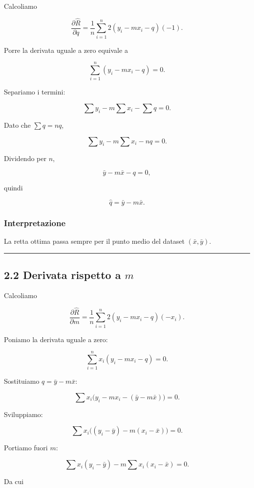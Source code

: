 \documentclass[
]{article}
\begin{document}
Calcoliamo

\[
\frac{\partial \hat R}{\partial q}
=
\frac{1}{n}\sum_{i=1}^n 2(y_i-mx_i-q)(-1).
\]

Porre la derivata uguale a zero equivale a

\[
\sum_{i=1}^n (y_i-mx_i-q)=0.
\]

Separiamo i termini:

\[
\sum y_i - m\sum x_i - \sum q = 0.
\]

Dato che \(\sum q = nq\),

\[
\sum y_i - m\sum x_i - nq = 0.
\]

Dividendo per \(n\),

\[
\bar y - m\bar x - q = 0,
\]

quindi

\[
\hat q = \bar y - m\bar x.
\]

\subsubsection{Interpretazione}\label{interpretazione-3}

La retta ottima passa sempre per il punto medio del dataset
\((\bar x,\bar y)\).

\begin{center}\rule{0.5\linewidth}{0.5pt}\end{center}

\subsection{\texorpdfstring{2.2 Derivata rispetto a
\(m\)}{2.2 Derivata rispetto a m}}\label{derivata-rispetto-a-m}

Calcoliamo

\[
\frac{\partial \hat R}{\partial m}
=
\frac{1}{n}\sum_{i=1}^n 2(y_i-mx_i-q)(-x_i).
\]

Poniamo la derivata uguale a zero:

\[
\sum_{i=1}^n x_i(y_i-mx_i-q)=0.
\]

Sostituiamo \(q=\bar y - m\bar x\):

\[
\sum x_i\big(y_i-mx_i-(\bar y-m\bar x)\big)=0.
\]

Sviluppiamo:

\[
\sum x_i\big((y_i-\bar y)-m(x_i-\bar x)\big)=0.
\]

Portiamo fuori \(m\):

\[
\sum x_i(y_i-\bar y)-m\sum x_i(x_i-\bar x)=0.
\]

Da cui
\end{document}
